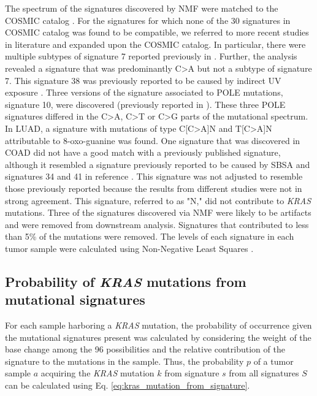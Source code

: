 \documentclass[english, 10pt, letterpaper]{article}
\newcommand{\KRAS}{\emph{KRAS}}
\begin{document}
The spectrum of the signatures discovered by NMF were matched to the COSMIC catalog \cite{Tate2019}.
For the signatures for which none of the 30 signatures in COSMIC catalog was found to be compatible, we referred to more recent studies in literature and expanded upon the COSMIC catalog. 
In particular, there were multiple subtypes of signature 7 reported previously in \cite{Hayward2017Whole-genomeSubtypes., Alexandrov2020TheCancer.}.
Further, the analysis revealed a signature that was predominantly C>A but not a subtype of signature 7.
This signature 38 was previously reported to be caused by indirect UV exposure \cite{Alexandrov2020TheCancer.}. 
Three versions of the signature associated to POLE mutations, signature 10, were discovered (previously reported in \cite{Alexandrov2020TheCancer.}).
These three POLE signatures differed in the C>A, C>T or C>G parts of the mutational spectrum. 
In LUAD, a signature with mutations of type C[C>A]N and T[C>A]N attributable to 8-oxo-guanine \cite{Alexandrov2020TheCancer.} was found. 
One signature that was discovered in COAD did not have a good match with a previously published signature, although it resembled a signature previously reported to be caused by SBSA \cite{Lee-Six2019} and signatures 34 and 41 in reference \cite{Alexandrov2020TheCancer.}. 
This signature was not adjusted to resemble those previously reported because the results from different studies were not in strong agreement.
This signature, referred to as "N," did not contribute to \KRAS{} mutations.
Three of the signatures discovered via NMF were likely to be artifacts \cite{Costello2013DiscoveryPreparation.} and were removed from downstream analysis. 
Signatures that contributed to less than 5\% of the mutations were removed. 
The levels of each signature in each tumor sample were calculated using Non-Negative Least Squares \cite{Gulhan2019DetectingSamples.}.


\subsection*{Probability of \KRAS{} mutations from mutational signatures}

For each sample harboring a \KRAS{} mutation, the probability of occurrence given the mutational signatures present was calculated by considering the weight of the base change among the 96 possibilities and the relative contribution of the signature to the mutations in the sample. 
Thus, the probability $p$ of a tumor sample $a$ acquiring the \KRAS{} mutation $k$ from signature $s$ from all signatures $S$ can be calculated using Eq. \ref{eq:kras_mutation_from_signature}.
\end{document}
